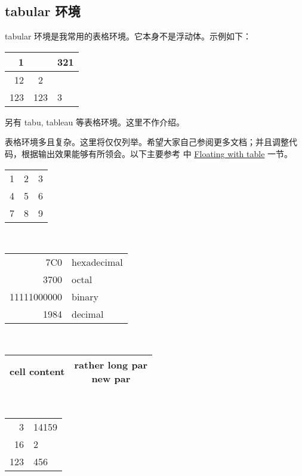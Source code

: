 \subsection{tabular 环境}
tabular 环境是我常用的表格环境。它本身不是浮动体。示例如下：
\begin{sidelst}
\begin{tabular}{|r|c|l|}
\cline{1-1} \cline{3-3}
1 & & 321 \\ \hline
12 & 2 \\[.5cm] \hline
123 & 123 & 3 \\ \hline
\end{tabular}
\end{sidelst}
另有 tabu, tableau 等表格环境。这里不作介绍。

表格环境多且复杂。这里将仅仅列举。希望大家自己参阅更多文档；并且调整代码，根据输出效果能够有所领会。以下主要参考 \cite{wiki:tables} 中 \href{https://en.wikibooks.org/wiki/LaTeX/Tables\#Floating\_with\_table}{Floating with table} 一节。
\begin{sidelst}
\centering     %
\begin{tabular}{r | l c}  %
1 & 2 & 3 \\              %
4 & 5 & 6 \\
7 & 8 & 9 \\ \hline       %
\end{tabular}
\\[1cm]
\begin{tabular}{|r|l|}    %
\hline
7C0 & hexadecimal \\
3700 & octal \\ \cline{2-2} %
11111000000 & binary \\
\hline \hline
1984 & decimal \\ \hline
\end{tabular}
\\[1cm]
\begin{tabular}{cc}
\hline %
cell content & \parbox[t]{2.cm}{rather long par\\new par}
\\ \hline
\end{tabular}
\\[1cm]
\begin{tabular}{r@{.}l} %
\hline
3   & 14159 \\
16  & 2     \\
123 & 456   \\ \hline
\end{tabular}
\end{sidelst}

